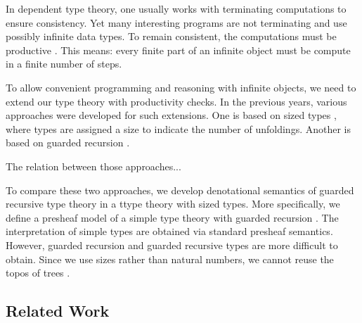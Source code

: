 In dependent type theory, one usually works with terminating computations to ensure consistency.
Yet many interesting programs are not terminating and use possibly infinite data types.
To remain consistent, the computations must be productive \cite{Coquand93}.
This means: every finite part of an infinite object must be compute in a finite number of steps.

To allow convenient programming and reasoning with infinite objects, we need to extend our type theory with productivity checks.
In the previous years, various approaches were developed for such extensions.
One is based on sized types \cite{A-sized,AVW-normalization}, where types are assigned a size to indicate the number of unfoldings.
Another is based on guarded recursion \cite{atkey2013productive,BahrGM17}.

The relation between those approaches...

To compare these two approaches, we develop denotational semantics of guarded recursive type theory in a ttype theory with sized types.
More specifically, we define a presheaf model of a simple type theory with guarded recursion \cite{BMSS-synthetic}.
The interpretation of simple types are obtained via standard presheaf semantics.
However, guarded recursion and guarded recursive types are more difficult to obtain.
Since we use sizes rather than natural numbers, we cannot reuse the topos of trees \cite{BMSS-synthetic}.

\subsection*{Related Work}